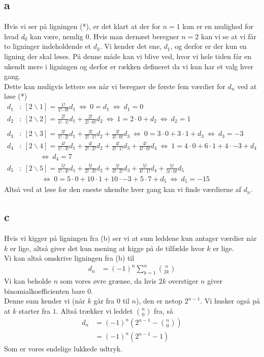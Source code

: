 \documentclass[12pt]{article}
\begin{document}
\subsection*{a}
Hvis vi ser på ligningen (*), er det klart at der for $n=1$ kun er en mulighed for hvad $d_0$ kan være, nemlig $0$. Hvis man dernæst beregner $n=2$ kan vi se at vi får to ligninger indeholdende et $d_k$. Vi kender det ene, $d_1$, og derfor er der kun en ligning der skal løses. På denne måde kan vi blive ved, hvor vi hele tiden får en ukendt mere i ligningen og derfor er rækken defineret da vi kun har et valg hver gang.\\
Dette kan muligvis lettere ses når vi beregner de første fem værdier for $d_n$ ved at løse (*)
\begin{align*}
d_1&:\ [2\backslash 1]=\frac{1!}{1!\cdot 0!}d_1\ \Leftrightarrow\ 0=d_1\  \Leftrightarrow\ d_1 = 0 \\
d_2&:\ [2\backslash 2]=\frac{2!}{1!\cdot 1!}d_1 + \frac{2!}{2!\cdot 0!}d_2 \ \Leftrightarrow\ 1=2\cdot 0+d_2\  \Leftrightarrow\ d_2 = 1 \\\\
d_3&:\ [2\backslash 3]=\frac{3!}{1!\cdot 2!}d_1 +\frac{3!}{2!\cdot 1!}d_2 + \frac{3!}{3!\cdot 0!}d_3 \ \Leftrightarrow\ 0=3\cdot 0+3\cdot 1+d_3\  \Leftrightarrow\ d_3 = -3 \\
d_4&:\ [2\backslash 4]=\frac{4!}{1!\cdot 3!}d_1 +\frac{4!}{2!\cdot 2!}d_2 + \frac{4!}{3!\cdot 1!}d_3 +\frac{4!}{4!\cdot 0!}d_4\ \Leftrightarrow\ 1=4\cdot 0+6\cdot 1+4\cdot -3+ d_4\\
&\ \ \ \ \ \ \ \ \ \ \ \ \ \Leftrightarrow\ d_4 = 7 \\
d_5&:\ [2\backslash 5]=\frac{5!}{1!\cdot 4!}d_1 +\frac{5!}{2!\cdot 3!}d_2 + \frac{5!}{3!\cdot 2!}d_3 +\frac{5!}{4!\cdot 1!}d_4+\frac{5!}{5!\cdot 0!}d_5\ \\
&\ \ \ \ \ \ \ \ \ \ \ \ \ \ \Leftrightarrow\ 0=5\cdot 0+10\cdot 1+10\cdot -3+ 5\cdot 7 + d_5\ \Leftrightarrow\ d_5=-15
\end{align*}
Altså ved at løse for den eneste ukendte hver gang kan vi finde værdierne af $d_n$.

\subsection*{c}
Hvis vi kigger på ligningen fra (b) ser vi at sum leddene kun antager værdier når $k$ er lige, altså giver det kun mening at kigge på de tilfælde hvor $k$ er lige. \\
Vi kan altså omskrive ligningen fra (b) til
\begin{align*}
d_n &= (-1)^n\sum_{k=1}^n \binom {n}{2k}
\end{align*}
Vi kan beholde $n$ som vores øvre grænse, da hvis $2k$ overstiger $n$ giver binomialkoefficienten bare $0$.\\
Denne sum kender vi (når $k$ går fra $0$ til $n$), den er netop $2^{n-1}$. Vi husker også på at $k$ starter fra $1$. Altså trækker vi leddet $\binom n 0$ fra, så
\begin{align*}
d_n &=(-1)^n\left(2^{n-1}-\binom n 0 \right) \\
&=(-1)^n(2^{n-1}-1)
\end{align*}
Som er vores endelige lukkede udtryk.\\
\end{document}
